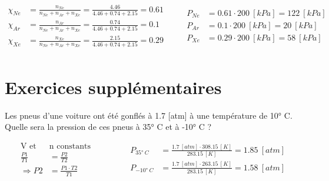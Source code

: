 \documentclass[
  11pt,
  a4paper,
  openany]{book}
\begin{document}
\begin{Answer}
\[
\begin{split}
    \chi_{Ne} &= \frac{n_{Ne}}{n_{Ne}+n_{Ar}+n_{Xe}} = \frac{4.46}{4.46+0.74+2.15} = 0.61 \\
    \chi_{Ar} &= \frac{n_{Ar}}{n_{Ne}+n_{Ar}+n_{Xe}} = \frac{0.74}{4.46+0.74+2.15} = 0.1 \\
    \chi_{Xe} &= \frac{n_{Xe}}{n_{Ne}+n_{Ar}+n_{Xe}} = \frac{2.15}{4.46+0.74+2.15} = 0.29\\
\end{split}
\qquad
\begin{split}
    P_{Ne} &= 0.61 \cdot 200\ [kPa] = 122\ [kPa] \\
    P_{Ar} &= 0.1 \cdot 200\ [kPa] = 20\ [kPa] \\
    P_{Xe} &= 0.29 \cdot 200\ [kPa] = 58\ [kPa] \\
\end{split}
\]

\end{Answer}

\hypertarget{exercices-suppluxe9mentaires-11}{%
\section{Exercices supplémentaires}\label{exercices-suppluxe9mentaires-11}}

\begin{Exercise}

Les pneus d'une voiture ont été gonflés à 1.7 {[}atm{]} à une température de 10° C. Quelle sera la pression de ces pneus à 35° C et à -10° C ?


\end{Exercise}

\begin{Answer}
\[
\begin{split}
    \text{V et } & \text{n constants}\\
    \frac{P1}{T1} &= \frac{P2}{T2} \\
    \Rightarrow P2 &= \frac{P1 \cdot T2}{T1}
\end{split}
\qquad\qquad
\begin{split}
    P_{35°\ C} &= \frac{1.7\ [atm] \cdot 308.15\ [K]}{283.15\ [K]} = 1.85\ [atm] \\[1em]
    P_{-10°\ C} &= \frac{1.7\ [atm] \cdot 263.15\ [K]}{283.15\ [K]} = 1.58\ [atm]
\end{split}
\]

\end{Answer}
\end{document}
